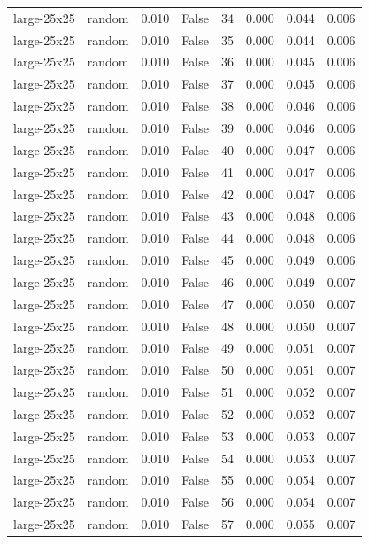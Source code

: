 \begin{tabular}{llrrrrrr}
large-25x25 & random & 0.010 & False & 34 & 0.000 & 0.044 & 0.006 \\
large-25x25 & random & 0.010 & False & 35 & 0.000 & 0.044 & 0.006 \\
large-25x25 & random & 0.010 & False & 36 & 0.000 & 0.045 & 0.006 \\
large-25x25 & random & 0.010 & False & 37 & 0.000 & 0.045 & 0.006 \\
large-25x25 & random & 0.010 & False & 38 & 0.000 & 0.046 & 0.006 \\
large-25x25 & random & 0.010 & False & 39 & 0.000 & 0.046 & 0.006 \\
large-25x25 & random & 0.010 & False & 40 & 0.000 & 0.047 & 0.006 \\
large-25x25 & random & 0.010 & False & 41 & 0.000 & 0.047 & 0.006 \\
large-25x25 & random & 0.010 & False & 42 & 0.000 & 0.047 & 0.006 \\
large-25x25 & random & 0.010 & False & 43 & 0.000 & 0.048 & 0.006 \\
large-25x25 & random & 0.010 & False & 44 & 0.000 & 0.048 & 0.006 \\
large-25x25 & random & 0.010 & False & 45 & 0.000 & 0.049 & 0.006 \\
large-25x25 & random & 0.010 & False & 46 & 0.000 & 0.049 & 0.007 \\
large-25x25 & random & 0.010 & False & 47 & 0.000 & 0.050 & 0.007 \\
large-25x25 & random & 0.010 & False & 48 & 0.000 & 0.050 & 0.007 \\
large-25x25 & random & 0.010 & False & 49 & 0.000 & 0.051 & 0.007 \\
large-25x25 & random & 0.010 & False & 50 & 0.000 & 0.051 & 0.007 \\
large-25x25 & random & 0.010 & False & 51 & 0.000 & 0.052 & 0.007 \\
large-25x25 & random & 0.010 & False & 52 & 0.000 & 0.052 & 0.007 \\
large-25x25 & random & 0.010 & False & 53 & 0.000 & 0.053 & 0.007 \\
large-25x25 & random & 0.010 & False & 54 & 0.000 & 0.053 & 0.007 \\
large-25x25 & random & 0.010 & False & 55 & 0.000 & 0.054 & 0.007 \\
large-25x25 & random & 0.010 & False & 56 & 0.000 & 0.054 & 0.007 \\
large-25x25 & random & 0.010 & False & 57 & 0.000 & 0.055 & 0.007 \\

\end{tabular}
